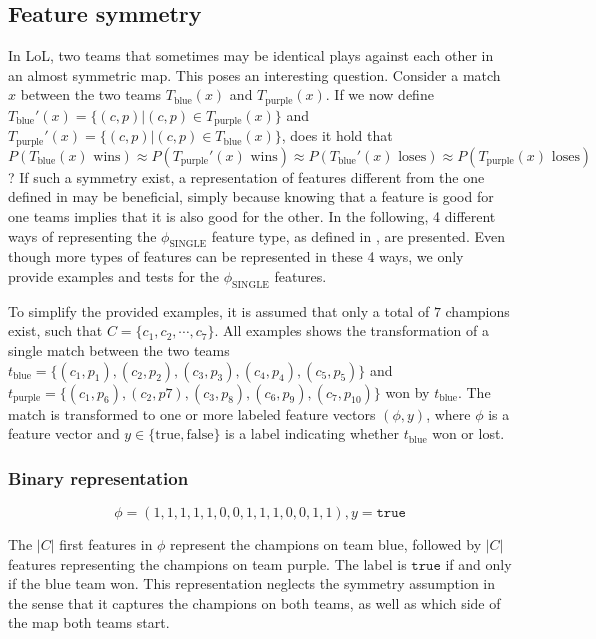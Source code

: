 \subsection{Feature symmetry}
\label{sec:representationoffeatures}
In LoL, two teams that sometimes may be identical plays against each other in an almost symmetric map.
This poses an interesting question.
Consider a match $x$ between the two teams $T_\text{blue}(x)$ and $T_\text{purple}(x)$.
If we now define $T_\text{blue}'(x) = \{(c,p) | (c,p) \in T_\text{purple}(x)\}$ and $T_\text{purple}'(x) = \{(c,p) | (c,p) \in T_\text{blue}(x)\}$,
does it hold that $P(T_\text{blue}(x) \text{ wins}) \approx P(T_\text{purple}'(x) \text{ wins}) \approx P(T_\text{blue}'(x) \text{ loses}) \approx P(T_\text{purple}(x) \text{ loses})$?
If such a symmetry exist, a representation of features different from the one defined in  may be beneficial, simply because knowing that a feature is good for one teams implies that it is also good for the other.
In the following, 4 different ways of representing the $\phi_\text{SINGLE}$ feature type, as defined in , are presented.
Even though more types of features can be represented in these 4 ways, we only provide examples and tests for the $\phi_\text{SINGLE}$ features.

To simplify the provided examples, it is assumed that only a total of $7$ champions exist, such that $C = \{c_1, c_2, \cdots, c_7\}$.
All examples shows the transformation of a single match between the two teams $t_\text{blue} = \{(c_1, p_1), (c_2,p_2), (c_3,p_3), (c_4,p_4), (c_5, p_5)\}$ and $t_\text{purple} = \{(c_1, p_6),(c_2,p7), (c_3,p_8),(c_6,p_9),(c_7,p_10)\}$ won by $t_\text{blue}$. The match is transformed to one or more labeled feature vectors $(\phi, y)$, where $\phi$ is a feature vector and $y \in \{\text{true}, \text{false}\}$ is a label indicating whether $t_\text{blue}$ won or lost.

\subsubsection{Binary representation}

\[ \phi = (1,1,1,1,1,0,0,1,1,1,0,0,1,1), y = \texttt{true} \]

The $|C|$ first features in $\phi$ represent the champions on team blue, followed by $|C|$ features representing the champions on team purple. The label is $\texttt{true}$ if and only if the blue team won.
This representation neglects the symmetry assumption in the sense that it captures the champions on both teams, as well as which side of the map both teams start.

